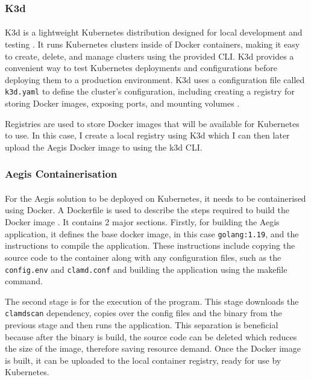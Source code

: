 \documentclass[12pt, conference, final, a4paper, onecolumn, compsoc]{IEEEtran}
\begin{document}
\subsubsection*{K3d}
\paragraph{}
K3d is a lightweight Kubernetes distribution designed for local
development and testing \citep{k3d}. It runs Kubernetes clusters inside of Docker
containers, making it easy to create, delete, and manage clusters using the
provided CLI. K3d provides a convenient way to test Kubernetes deployments and
configurations before deploying them to a production environment. K3d uses a
configuration file called \texttt{k3d.yaml} to define the cluster's
configuration, including creating a registry for storing Docker images, exposing
ports, and mounting volumes \citep{k3d-conf}.

Registries are used to store Docker images that will be available for Kubernetes
to use. In this case, I create a local registry using K3d which I can then later
upload the Aegis Docker image to using the k3d CLI.

\subsubsection*{Aegis Containerisation}
\paragraph{}
For the Aegis solution to be deployed on Kubernetes, it needs to be
containerised using Docker. A Dockerfile is used to describe the steps required
to build the Docker image \citep{dockerfile} \citep{dockerfile-micro}. It contains 2 major sections.
Firstly, for building the Aegis application, it defines the base docker image, in this
case \texttt{golang:1.19}, and the instructions to compile the application. These
instructions include copying the source code to the container along with any
configuration files, such as the \texttt{config.env} and \texttt{clamd.conf} and
building the application using the makefile command.

The second stage is for the execution of the program. This stage downloads the
\texttt{clamdscan} dependency, copies over the config files and the binary from
the previous stage and then runs the application. This separation is beneficial
because after the binary is build, the source code can be deleted which reduces
the size of the image, therefore saving resource demand. Once the Docker image
is built, it can be uploaded to the local container registry, ready for use by
Kubernetes.
\end{document}
